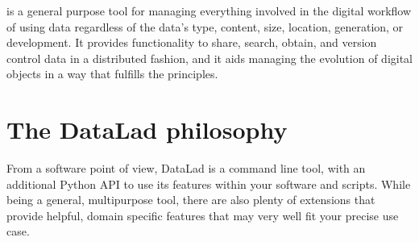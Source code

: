 \sphinxAtStartPar
{} is a general purpose tool for managing everything involved in the
digital workflow of using data \textendash{} regardless of the data’s type, content, size,
location, generation, or development.  It provides functionality to share,
search, obtain, and version control data in a distributed fashion, and it aids
managing the evolution of digital objects in a way that fulfills the 
principles.


\section{The DataLad philosophy}
\label{\detokenize{intro/philosophy:the-datalad-philosophy}}
\sphinxAtStartPar
From a software point of view, DataLad is a command line tool, with an additional
Python API to use its features within your software and scripts.
While being a general, multi\sphinxhyphen{}purpose tool, there are also plenty of extensions
that provide helpful, domain specific features that may very well fit your precise use case.

